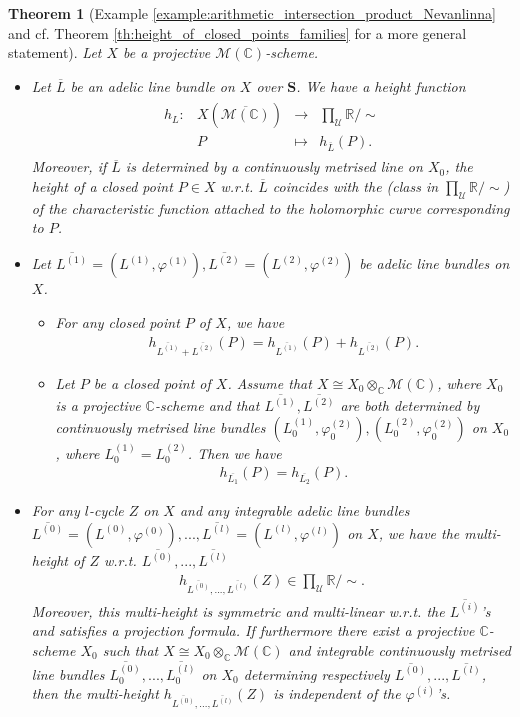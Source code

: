 \documentclass [11pt,reqno]{amsart}
\def\bC{{\mathbb{C}}}
\def\bR{{\mathbb{R}}}
\newcommand{\1}{\mathmybb{1}}
\def\cM{{\mathcal{M}}}
\def\cU{{\mathcal{U}}}
\newtheorem{theo}{Theorem}
\newcommand{\fonction}[5]{\begin{array}{l|rcl}
#1: & #2 & \longrightarrow & #3 \\
    & #4 & \longmapsto & #5 \end{array}}
\begin{document}
\begin{theo}[Example \ref{example:arithmetic_intersection_product_Nevanlinna} and cf. Theorem \ref{th:height_of_closed_points_families} for a more general statement]
Let $X$ be a projective $\cM(\bC)$-scheme.
\begin{itemize}
	\item[(1)] Let $\overline{L}$ be an adelic line bundle on $X$ over $\mathbf{S}$. We have a \emph{height function}
	\begin{align*}
	\fonction{h_{L}}{X(\overline{\cM(\bC)})}{\prod_{\cU}\bR/\sim}{P}{h_{\overline{L}}(P).}
	\end{align*}
	Moreover, if $\overline{L}$ is determined by a continuously metrised line on $X_{0}$, the height of a closed point $P\in X$ w.r.t. $\overline{L}$ coincides with the (class in $\prod_{\cU}\bR/\sim$) of the characteristic function attached to the holomorphic curve corresponding to $P$.
	\item[(2)] Let $\overline{L^{(1)}}=(L^{(1)},\varphi^{(1)}),\overline{L^{(2)}}=(L^{(2)},\varphi^{(2)})$ be adelic line bundles on $X$.
	\begin{itemize}
		\item[(i)] For any closed point $P$ of $X$, we have
	\begin{align*}
	h_{\overline{L^{(1)}}+\overline{L^{(2)}}}(P) = h_{\overline{L^{(1)}}}(P) + h_{\overline{L^{(2)}}}(P).
	\end{align*}
		\item[(ii)] Let $P$ be a closed point of $X$. Assume that $X\cong X_{0}\otimes_{\bC}\cM(\bC)$, where $X_{0}$ is a projective $\bC$-scheme and that $\overline{L^{(1)}},\overline{L^{(2)}}$ are both determined by continuously metrised line bundles $(L^{(1)}_{0},\varphi_{0}^{(2)}),(L_{0}^{(2)},\varphi_{0}^{(2)})$ on $X_{0}$, where $L_{0}^{(1)}=L_{0}^{(2)}$. Then we have 
	\begin{align*}
	h_{\overline{L_1}}(P)= h_{\overline{L_2}}(P).
	\end{align*}
\end{itemize}
	\item[(3)] For any $l$-cycle $Z$ on $X$ and any integrable adelic line bundles $\overline{L^{(0)}}=(L^{(0)},\varphi^{(0)}),...,\overline{L^{(l)}}=(L^{(l)},\varphi^{(l)})$ on $X$, we have the \emph{multi-height} of $Z$ w.r.t. $\overline{L^{(0)}},...,\overline{L^{(l)}}$
	\begin{align*}
	h_{\overline{L^{(0)}},...,\overline{L^{(l)}}}(Z)\in\displaystyle\prod_{\cU}\bR/\sim.
	\end{align*}
	Moreover, this multi-height is symmetric and multi-linear w.r.t. the $\overline{L^{(i)}}$'s and satisfies a projection formula. If furthermore there exist a projective $\bC$-scheme $X_{0}$ such that $X\cong X_{0}\otimes_{\bC}\cM(\bC)$ and integrable continuously metrised line bundles $\overline{L_{0}^{(0)}},...,\overline{L_{0}^{(l)}}$ on $X_{0}$ determining respectively $\overline{L^{(0)}},...,\overline{L^{(l)}}$, then the multi-height $h_{\overline{L^{(0)}},...,\overline{L^{(l)}}}(Z)$ is independent of the $\varphi^{(i)}$'s.
\end{itemize}
\end{theo}
\end{document}
